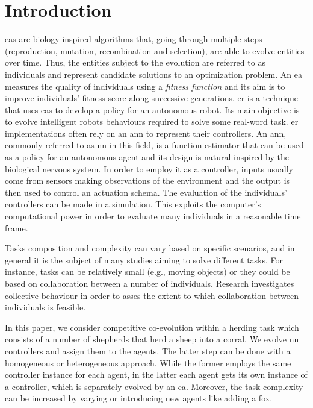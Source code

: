 \documentclass[conference]{IEEEtran}
\begin{document}
\section{Introduction}
\glspl{ea} are biology inspired algorithms that, going through multiple steps (reproduction, mutation, recombination and selection), are able to evolve entities over time.
Thus, the entities subject to the evolution are referred to as individuals and represent candidate solutions to an optimization problem.
An \gls{ea} measures the quality of individuals using a \textit{fitness function} and its aim is to improve individuals' fitness score along successive generations.
\gls{er} is a technique that uses \gls{ea}s to develop a policy for an autonomous robot.
Its main objective is to evolve intelligent robots behaviours required to solve some real-word task.
\gls{er} implementations often rely on an \gls{ann} to represent their controllers.
An \gls{ann}, commonly referred to as \gls{nn} in this field, is a function estimator that can be used as a policy for an autonomous agent and its design is natural inspired by the biological nervous system.
In order to employ it as a controller, inputs usually come from sensors making observations of the environment and the output is then used to control an actuation schema.
The evaluation of the individuals' controllers can be made in a simulation.
This exploits the computer's computational power in order to evaluate many individuals in a reasonable time frame.

Tasks composition and complexity can vary based on specific scenarios, and in general it is the subject of many studies aiming to solve different tasks.
For instance, tasks can be relatively small (e.g., moving objects) or they could be based on collaboration between a number of individuals.
Research investigates collective behaviour in order to asses the extent to which collaboration between individuals is feasible.  

In this paper, we consider competitive co-evolution within a herding task which consists of a number of shepherds that herd a sheep into a corral.
We evolve \gls{nn} controllers and assign them to the agents. The latter step can be done with a homogeneous or heterogeneous approach.
While the former employs the same controller instance for each agent,
in the latter each agent gets its own instance of a controller, which is separately evolved by an \gls{ea}.
Moreover, the task complexity can be increased by varying or introducing new agents like adding a fox.
\end{document}
